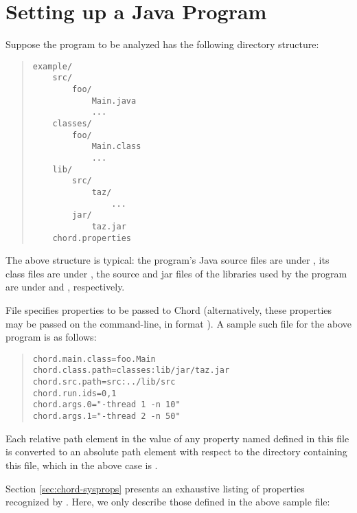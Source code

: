 \section{Setting up a Java Program}
\label{sec:program-setup}

Suppose the program to be analyzed has the following directory structure:

\begin{quote}
\begin{verbatim}
example/
    src/
        foo/
            Main.java
            ...
    classes/
        foo/
            Main.class
            ...
    lib/
        src/
            taz/
                ...
        jar/
            taz.jar
    chord.properties
\end{verbatim}
\end{quote}

\noindent The above structure is typical: the program's Java source files are under ,
its class files are under , the source and jar files of the libraries
used by the program are under  and , respectively.

File  specifies properties to be passed to Chord (alternatively,
these properties may be passed on the command-line, in format ).
A sample such file for the above program is as follows:

\begin{quote}
\begin{verbatim}
chord.main.class=foo.Main
chord.class.path=classes:lib/jar/taz.jar
chord.src.path=src:../lib/src
chord.run.ids=0,1
chord.args.0="-thread 1 -n 10"
chord.args.1="-thread 2 -n 50"
\end{verbatim}
\end{quote}

Each relative path element in the value of any property
named  defined in this file is converted to an absolute path element with respect
to the directory containing this file, which in the above case is .

Section \ref{sec:chord-sysprops} presents an exhaustive
listing of properties recognized by \Chord.
Here, we only describe those defined in the above
sample  file:

